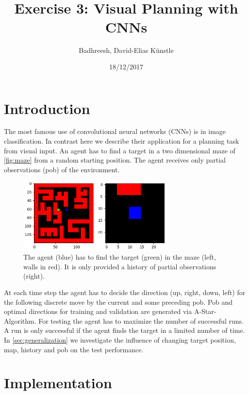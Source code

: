 \documentclass[a4paper,14pt]{article}
\begin{document}
\title{Exercise 3: Visual Planning with CNNs}
\author{Badhreesh, David-Elias K\"unstle}
\date{18/12/2017}
\maketitle
\section{Introduction}

The most famous use of convolutional neural networks (CNNs) is in image classification.
In contrast here we describe their application for a planning task from visual input.
An agent has to find a target in a two dimensional maze of \autoref{fig:maze} from a random starting
position. The agent receives only partial observations (pob) of the environment.

\begin{figure}[h]
  \centering
  \includegraphics[width=0.7\textwidth]{maze}
  \caption{The agent (blue) has to find the target (green) in the maze (left,
    walls in red). It is only provided a history of partial observations
    (right).}
  \label{fig:maze}
\end{figure}

At each time step the agent has to decide the direction (up, right, down, left)
for the following discrete move by the current and some preceding pob.
Pob and optimal directions for training and validation are generated via
A-Star-Algorithm.
For testing the agent has to maximize the number of successful runs.
A run is only successful if the agent finds the target in a limited number of
time.
In \autoref{sec:generalization} we investigate the influence of changing target position, map,
history and pob on the test performance.

\section{Implementation}
\end{document}
